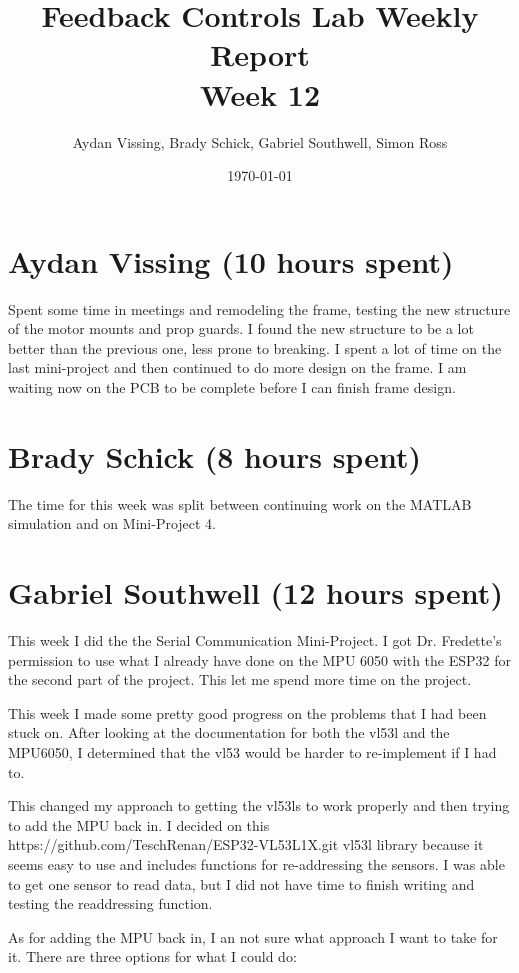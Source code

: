 \documentclass[12pt, titlepage]{article}
\title{Feedback Controls Lab Weekly Report \\ \normalsize{Week 12}}
\author{Aydan Vissing, Brady Schick, Gabriel Southwell, Simon Ross}
\date{\today}
\begin{document}
\maketitle

\section*{Aydan Vissing (10 hours spent)}

Spent some time in meetings and remodeling the frame, testing the new structure of the motor mounts and prop guards. I found the new structure to be a lot better than the previous one, less prone to breaking. I spent a lot of time on the last mini-project and then continued to do more design on the frame. I am waiting now on the PCB to be complete before I can finish frame design. 

\section*{Brady Schick (8 hours spent)}

The time for this week was split between continuing work on the MATLAB simulation and on Mini-Project 4.

\section*{Gabriel Southwell (12 hours spent)}

This week I did the the Serial Communication Mini-Project. I got Dr. Fredette's permission to use what I already have done on the MPU 6050 with the ESP32 for the second part of the project. This let me spend more time on the project.

This week I made some pretty good progress on the problems that I had been stuck on. After looking at the documentation for both the vl53l and the MPU6050, I determined that the vl53 would be harder to re-implement if I had to. 

This changed my approach to getting the vl53ls to work properly and then trying to add the MPU back in. I decided on this https://github.com/TeschRenan/ESP32-VL53L1X.git vl53l library because it seems easy to use and includes functions for re-addressing the sensors. I was able to get one sensor to read data, but I did not have time to finish writing and testing the readdressing function. 

As for adding the MPU back in, I an not sure what approach I want to take for it. There are three options for what I could do:
\end{document}
